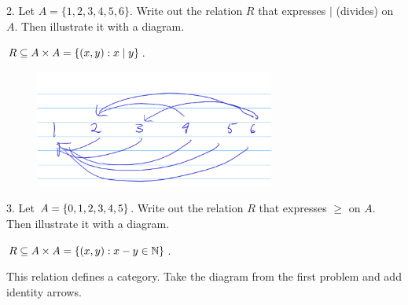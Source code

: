 \documentclass[openany, 12pt]{book}
\begin{document}
\begin{exercise}{}{}
	{2. Let $A=\{1,2,3,4,5,6\}$. Write out the relation $R$ that expresses $\mid$ (divides) on $A$. Then illustrate it with a diagram.}
	\begin{alist}
		\item $R\subseteq A\times A = \{(x, y): x\mid y\}$.
	\end{alist}
\end{exercise}
\begin{figure}
	\centering
	\includegraphics[width=0.7\textwidth]{images/11-01-02.png}
\end{figure}

\begin{exercise}{}{}
	{3. Let $A=\{0,1,2,3,4,5\}$. Write out the relation $R$ that expresses $\geq$ on $A$. Then illustrate it with a diagram.}
	\begin{alist}
		\item $R\subseteq A\times A = \{(x, y): x-y \in \mathbb{N}\}$.
		\item This relation defines a category. Take the diagram from the first problem and add identity arrows.
	\end{alist}
\end{exercise}
\end{document}
